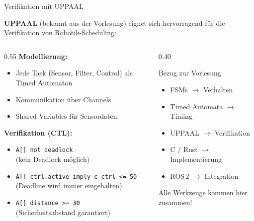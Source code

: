 \documentclass[%
  aspectratio=169,
  10pt
]{beamer}
\begin{document}
\begin{frame}{Verifikation mit UPPAAL}

\textbf{UPPAAL} (bekannt aus der Vorlesung) eignet sich hervorragend
für die Verifikation von Robotik-Scheduling:

\vspace{3mm}
\begin{columns}[T]
  \begin{column}{0.55\textwidth}
    \textbf{Modellierung:}
    \begin{itemize}
      \item Jede Task (Sensor, Filter, Control) als
            Timed Automaton
      \item Kommunikation über Channels
      \item Shared Variables für Sensordaten
    \end{itemize}

    \vspace{2mm}
    \textbf{Verifikation (CTL):}
    \begin{itemize}
      \item \texttt{A[] not deadlock}\\
            {\scriptsize (kein Deadlock möglich)}
      \item \texttt{A[] ctrl.active imply c\_ctrl <= 50}\\
            {\scriptsize (Deadline wird immer eingehalten)}
      \item \texttt{A[] distance >= 30}\\
            {\scriptsize (Sicherheitsabstand garantiert)}
    \end{itemize}
  \end{column}
  \begin{column}{0.40\textwidth}
    \begin{alertblock}{Bezug zur Vorlesung}
      \begin{itemize}
        \item FSMs $\rightarrow$ Verhalten
        \item Timed Automata $\rightarrow$ Timing
        \item UPPAAL $\rightarrow$ Verifikation
        \item C / Rust $\rightarrow$ Implementierung
        \item ROS\,2 $\rightarrow$ Integration
      \end{itemize}
      Alle Werkzeuge kommen hier zusammen!
    \end{alertblock}
  \end{column}
\end{columns}

\end{frame}
\end{document}
